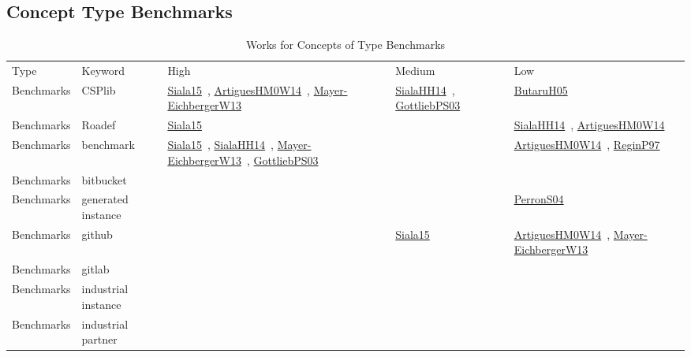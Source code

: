 \clearpage
\subsection{Concept Type Benchmarks}
\label{sec:Benchmarks}
{\scriptsize
\begin{longtable}{lp{3cm}>{\raggedright\arraybackslash}p{6cm}>{\raggedright\arraybackslash}p{6cm}>{\raggedright\arraybackslash}p{8cm}}
\rowcolor{white}\caption{Works for Concepts of Type Benchmarks}\\ \toprule
\rowcolor{white}Type & Keyword & High & Medium & Low\\ \midrule\endhead
\bottomrule
\endfoot
Benchmarks & CSPlib & \href{cars/works/Siala15.pdf}{Siala15}~\cite{Siala15}, \href{cars/works/ArtiguesHM0W14.pdf}{ArtiguesHM0W14}~\cite{ArtiguesHM0W14}, \href{cars/works/Mayer-EichbergerW13.pdf}{Mayer-EichbergerW13}~\cite{Mayer-EichbergerW13} & \href{cars/works/SialaHH14.pdf}{SialaHH14}~\cite{SialaHH14}, \href{cars/works/GottliebPS03.pdf}{GottliebPS03}~\cite{GottliebPS03} & \href{cars/works/ButaruH05.pdf}{ButaruH05}~\cite{ButaruH05}\\
Benchmarks & Roadef & \href{cars/works/Siala15.pdf}{Siala15}~\cite{Siala15} &  & \href{cars/works/SialaHH14.pdf}{SialaHH14}~\cite{SialaHH14}, \href{cars/works/ArtiguesHM0W14.pdf}{ArtiguesHM0W14}~\cite{ArtiguesHM0W14}\\
Benchmarks & benchmark & \href{cars/works/Siala15.pdf}{Siala15}~\cite{Siala15}, \href{cars/works/SialaHH14.pdf}{SialaHH14}~\cite{SialaHH14}, \href{cars/works/Mayer-EichbergerW13.pdf}{Mayer-EichbergerW13}~\cite{Mayer-EichbergerW13}, \href{cars/works/GottliebPS03.pdf}{GottliebPS03}~\cite{GottliebPS03} &  & \href{cars/works/ArtiguesHM0W14.pdf}{ArtiguesHM0W14}~\cite{ArtiguesHM0W14}, \href{cars/works/ReginP97.pdf}{ReginP97}~\cite{ReginP97}\\
Benchmarks & bitbucket &  &  & \\
Benchmarks & generated instance &  &  & \href{cars/works/PerronS04.pdf}{PerronS04}~\cite{PerronS04}\\
Benchmarks & github &  & \href{cars/works/Siala15.pdf}{Siala15}~\cite{Siala15} & \href{cars/works/ArtiguesHM0W14.pdf}{ArtiguesHM0W14}~\cite{ArtiguesHM0W14}, \href{cars/works/Mayer-EichbergerW13.pdf}{Mayer-EichbergerW13}~\cite{Mayer-EichbergerW13}\\
Benchmarks & gitlab &  &  & \\
Benchmarks & industrial instance &  &  & \\
Benchmarks & industrial partner &  &  & \\

\end{longtable}}
